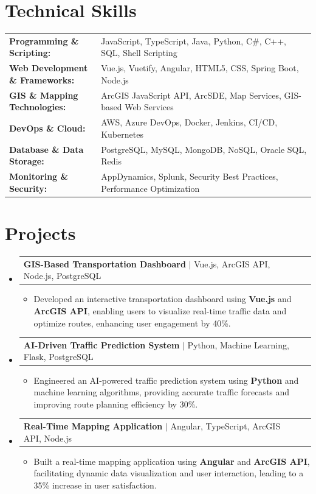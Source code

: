 \documentclass[letterpaper,10pt]{article}
\makeatletter
\newcommand{\resumeItem}[1]{
  \item{\fontsize{8pt}{9pt}\selectfont
    #1 \vspace{-3pt}
  }
}
\newcommand{\resumeProjectHeading}[2]{
    \item
    \begin{tabular*}{1.001\textwidth}{l@{\extracolsep{\fill}}r}
      \fontsize{8.5pt}{10pt}#1 & \textbf{\fontsize{8.5pt}{10pt} #2}\\
    \end{tabular*}\vspace{-7pt}
}
\newcommand{\resumeSubHeadingListStart}{\begin{itemize}[leftmargin=0pt, label={}]}
\newcommand{\resumeSubHeadingListEnd}{\end{itemize}}
\newcommand{\resumeItemListStart}{\begin{itemize}[leftmargin=*]}
\newcommand{\resumeItemListEnd}{\end{itemize}\vspace{-5pt}}
\makeatother
\begin{document}
\section{Technical Skills}
        \vspace{-14pt}
        \begin{table}[h]
            \fontsize{8pt}{9pt}\selectfont
            \begin{tabular}{p{0.3\linewidth} p{0.7\linewidth}}
                \textbf{Programming \& Scripting:} & JavaScript, TypeScript, Java, Python, C\#, C++, SQL, Shell Scripting \\
                \textbf{Web Development \& Frameworks:} & Vue.js, Vuetify, Angular, HTML5, CSS, Spring Boot, Node.js \\
                \textbf{GIS \& Mapping Technologies:} & ArcGIS JavaScript API, ArcSDE, Map Services, GIS-based Web Services \\
                \textbf{DevOps \& Cloud:} & AWS, Azure DevOps, Docker, Jenkins, CI/CD, Kubernetes \\
                \textbf{Database \& Data Storage:} & PostgreSQL, MySQL, MongoDB, NoSQL, Oracle SQL, Redis \\
                \textbf{Monitoring \& Security:} & AppDynamics, Splunk, Security Best Practices, Performance Optimization \\
            \end{tabular}
        \end{table}
 \vspace{-18pt}

\section{Projects}
    \vspace{-5pt}
    \resumeSubHeadingListStart
          \resumeProjectHeading
            {\textbf{GIS-Based Transportation Dashboard} $|$ Vue.js, ArcGIS API, Node.js, PostgreSQL}{}
            \resumeItemListStart
                \resumeItem{Developed an interactive transportation dashboard using \textbf{Vue.js} and \textbf{ArcGIS API}, enabling users to visualize real-time traffic data and optimize routes, enhancing user engagement by 40\%.}
            \resumeItemListEnd
        \vspace{-12pt}
    
        \resumeProjectHeading
            {\textbf{AI-Driven Traffic Prediction System} $|$ Python, Machine Learning, Flask, PostgreSQL}{}
        \resumeItemListStart
                \resumeItem{Engineered an AI-powered traffic prediction system using \textbf{Python} and machine learning algorithms, providing accurate traffic forecasts and improving route planning efficiency by 30\%.}
        \resumeItemListEnd
      \vspace{-12pt}
      \resumeProjectHeading
        {\textbf{Real-Time Mapping Application} $|$ Angular, TypeScript, ArcGIS API, Node.js}{}
    \resumeItemListStart
            \resumeItem{Built a real-time mapping application using \textbf{Angular} and \textbf{ArcGIS API}, facilitating dynamic data visualization and user interaction, leading to a 35\% increase in user satisfaction.}
    \resumeItemListEnd
    \resumeSubHeadingListEnd
\end{document}
